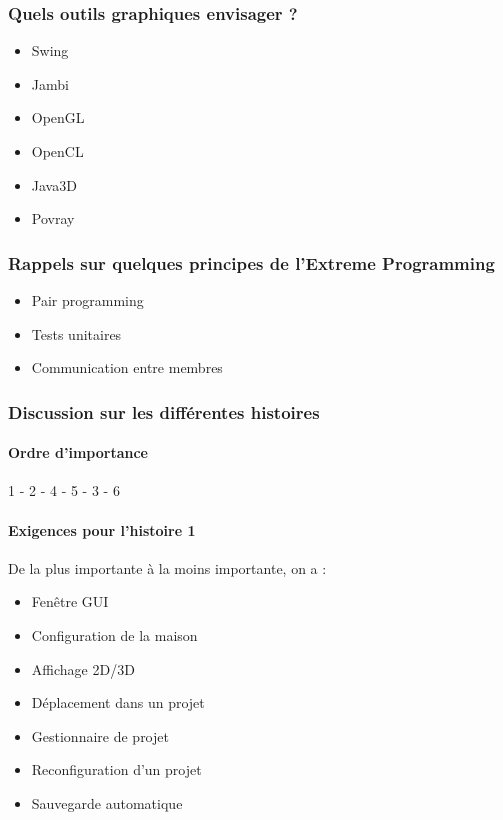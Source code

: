 \documentclass[12pt,a4paper]{article}
\begin{document}
		\subsubsection{Quels outils graphiques envisager ?}
			\begin{itemize}
				\item Swing
				\item Jambi
				\item OpenGL
				\item OpenCL
				\item Java3D
				\item Povray
			\end{itemize}
		\subsubsection{Rappels sur quelques principes de l'Extreme Programming}
			\begin{itemize}
				\item Pair programming
				\item Tests unitaires
				\item Communication entre membres
			\end{itemize}
		\subsubsection{Discussion sur les différentes histoires}
			\paragraph{Ordre d'importance}
				1 - 2 - 4 - 5 - 3 - 6
			\paragraph{Exigences pour l'histoire 1 \\}
				De la plus importante à la moins importante, on a :
				\begin{itemize}
					\item Fenêtre GUI
					\item Configuration de la maison
					\item Affichage 2D/3D
					\item Déplacement dans un projet
					\item Gestionnaire de projet
					\item Reconfiguration d'un projet
					\item Sauvegarde automatique
				\end{itemize}
\end{document}
